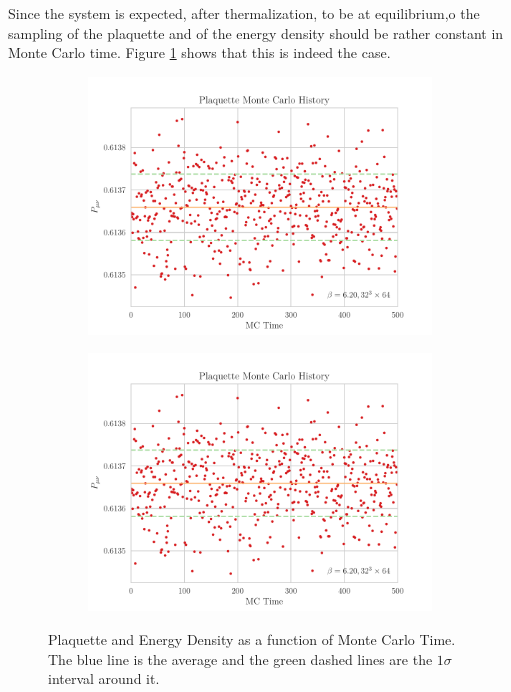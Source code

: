 Since the system is expected, after thermalization, to be at equilibrium,o the sampling of the plaquette and of the energy density should be rather constant in Monte Carlo time. Figure \ref{fig:MCPlaqEnerg} shows that this is indeed the case.
\begin{figure}[hbt!]
    \centering
    \begin{subfigure}{0.45\textwidth}
        \includegraphics[width=\textwidth]{results/MCPlaq.pdf}
    \end{subfigure}
    \begin{subfigure}{0.45\textwidth}
        \includegraphics[width=\textwidth]{results/MCPlaq.pdf}
    \end{subfigure}
    \caption{\footnotesize Plaquette and Energy Density as a function of Monte Carlo Time. The blue line is the average and the green dashed lines are the $1\sigma$ interval around it. }
    \label{fig:MCPlaqEnerg}
\end{figure} 

